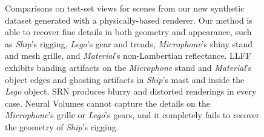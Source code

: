 \documentclass[runningheads]{llncs}
\newcommand{\scenename}[1]{\textit{#1}}
\begin{document}
\begin{figure}[t]
\begin{tabular}{@{}c@{}c@{}c@{}c@{}c@{}c@{}}
\end{tabular} 
\caption{Comparisons on test-set views for scenes from our new synthetic dataset generated with a physically-based renderer. Our method is able to recover fine details in both geometry and appearance, such as \scenename{Ship}'s rigging, \scenename{Lego}'s gear and treads, \scenename{Microphone}'s shiny stand and mesh grille, and \scenename{Material}'s non-Lambertian reflectance. LLFF exhibits banding artifacts on the \scenename{Microphone} stand and \scenename{Material}'s object edges and ghosting artifacts in \scenename{Ship}'s mast and inside the \scenename{Lego} object. SRN produces blurry and distorted renderings in every case. Neural Volumes cannot capture the details on the \scenename{Microphone}'s grille or \scenename{Lego}'s gears, and it completely fails to recover the geometry of \scenename{Ship}'s rigging.}
\label{fig:synthresults}
\end{figure}
\end{document}
